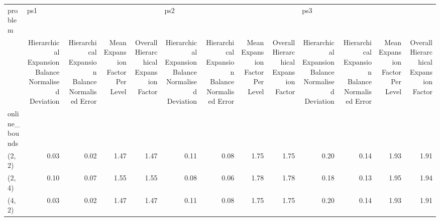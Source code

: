 \begin{tabular}{lrrrrrrrrrrrr}
\toprule
problem & \multicolumn{4}{l}{ps1} & \multicolumn{4}{l}{ps2} & \multicolumn{4}{l}{ps3} \\
{} & Hierarchical Expansion Balance Normalised Deviation & Hierarchical Expansion Balance Normalised Error & Mean Expansion Factor Per Level & Overall Hierarchical Expansion Factor & Hierarchical Expansion Balance Normalised Deviation & Hierarchical Expansion Balance Normalised Error & Mean Expansion Factor Per Level & Overall Hierarchical Expansion Factor & Hierarchical Expansion Balance Normalised Deviation & Hierarchical Expansion Balance Normalised Error & Mean Expansion Factor Per Level & Overall Hierarchical Expansion Factor \\
online\_bounds &                                                     &                                                 &                                 &                                       &                                                     &                                                 &                                 &                                       &                                                     &                                                 &                                 &                                       \\
\midrule
(2, 2)        &                                               0.03 &                                            0.02 &                            1.47 &                                  1.47 &                                               0.11 &                                            0.08 &                            1.75 &                                  1.75 &                                               0.20 &                                            0.14 &                            1.93 &                                  1.91 \\
(2, 4)        &                                               0.10 &                                            0.07 &                            1.55 &                                  1.55 &                                               0.08 &                                            0.06 &                            1.78 &                                  1.78 &                                               0.18 &                                            0.13 &                            1.95 &                                  1.94 \\
(4, 2)        &                                               0.03 &                                            0.02 &                            1.47 &                                  1.47 &                                               0.11 &                                            0.08 &                            1.75 &                                  1.75 &                                               0.20 &                                            0.14 &                            1.93 &                                  1.91 \\

\end{tabular}
